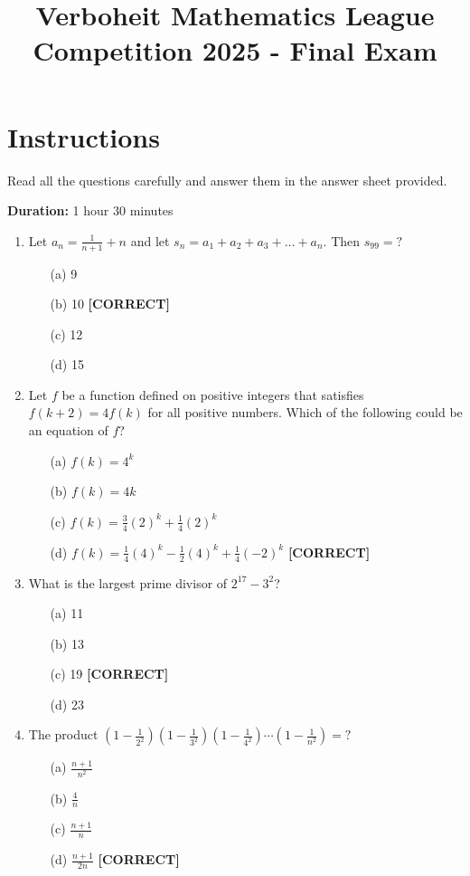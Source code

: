 \documentclass[12pt]{article}
\title{Verboheit Mathematics League Competition 2025 - Final Exam}
\date{}
\begin{document}
\maketitle

\section*{Instructions}
Read all the questions carefully and answer them in the answer sheet provided.

\textbf{Duration:} 1 hour 30 minutes

\begin{enumerate}

\item Let $a_n = \frac{1}{n+1} + n$ and let $s_n = a_1 + a_2 + a_3 + \ldots + a_n$. Then $s_{99} = ?$
\begin{enumerate}
    \item[(a)] 9
    \item[(b)] 10 \quad \textbf{[CORRECT]}
    \item[(c)] 12
    \item[(d)] 15
\end{enumerate}

\item Let $f$ be a function defined on positive integers that satisfies $f(k + 2) = 4f(k)$ for all positive numbers. Which of the following could be an equation of $f$?
\begin{enumerate}
    \item[(a)] $f(k) = 4^k$
    \item[(b)] $f(k) = 4k$
    \item[(c)] $f(k) = \frac{3}{4}(2)^k + \frac{1}{4}(2)^k$
    \item[(d)] $f(k) = \frac{1}{4}(4)^k - \frac{1}{2}(4)^k + \frac{1}{4}(-2)^k$ \quad \textbf{[CORRECT]}
\end{enumerate}

\item What is the largest prime divisor of $2^{17} - 3^2$?
\begin{enumerate}
    \item[(a)] 11
    \item[(b)] 13
    \item[(c)] 19 \quad \textbf{[CORRECT]}
    \item[(d)] 23
\end{enumerate}

\item The product $\left(1 - \frac{1}{2^2}\right)\left(1 - \frac{1}{3^2}\right)\left(1 - \frac{1}{4^2}\right) \cdots \left(1 - \frac{1}{n^2}\right) = ?$
\begin{enumerate}
    \item[(a)] $\frac{n+1}{n^2}$
    \item[(b)] $\frac{4}{n}$
    \item[(c)] $\frac{n+1}{n}$
    \item[(d)] $\frac{n+1}{2n}$ \quad \textbf{[CORRECT]}
\end{enumerate}


\end{enumerate}
\end{document}
